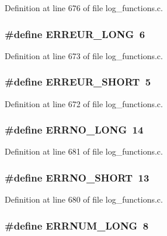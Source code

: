 Definition at line 676 of file log\_\-functions.c.
\subsubsection[{ERREUR\_\-LONG}]{\setlength{\rightskip}{0pt plus 5cm}\#define ERREUR\_\-LONG~6}\label{log__functions_8c_ab74d6bbfcddb14e95a1d84f9149e62d4}


Definition at line 673 of file log\_\-functions.c.
\subsubsection[{ERREUR\_\-SHORT}]{\setlength{\rightskip}{0pt plus 5cm}\#define ERREUR\_\-SHORT~5}\label{log__functions_8c_a6029c78a8cd07da6d8ced1675dad9915}


Definition at line 672 of file log\_\-functions.c.
\subsubsection[{ERRNO\_\-LONG}]{\setlength{\rightskip}{0pt plus 5cm}\#define ERRNO\_\-LONG~14}\label{log__functions_8c_af8d2b8b5adb8a39e3facdde8e5111e68}


Definition at line 681 of file log\_\-functions.c.
\subsubsection[{ERRNO\_\-SHORT}]{\setlength{\rightskip}{0pt plus 5cm}\#define ERRNO\_\-SHORT~13}\label{log__functions_8c_aca289685c60e5f8245a13c0037185826}


Definition at line 680 of file log\_\-functions.c.
\subsubsection[{ERRNUM\_\-LONG}]{\setlength{\rightskip}{0pt plus 5cm}\#define ERRNUM\_\-LONG~8}\label{log__functions_8c_ac6973106836685c38ed6eab4aae8b828}


